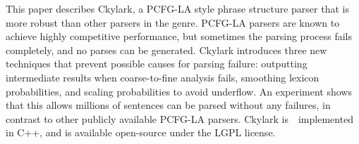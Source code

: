 This paper describes Ckylark, a PCFG-LA style phrase structure parser that is more robust than other parsers in the genre.  PCFG-LA parsers are known to achieve highly competitive performance, but sometimes the parsing process fails completely, and no parses can be generated.  Ckylark introduces three new techniques that prevent possible causes for parsing failure: outputting intermediate results when coarse-to-fine analysis fails, smoothing lexicon probabilities, and scaling probabilities to avoid underflow.  An experiment shows that this allows millions of sentences can be parsed without any failures, in contrast to other publicly available PCFG-LA parsers. Ckylark is　implemented in C++, and is available open-source under the LGPL license.
